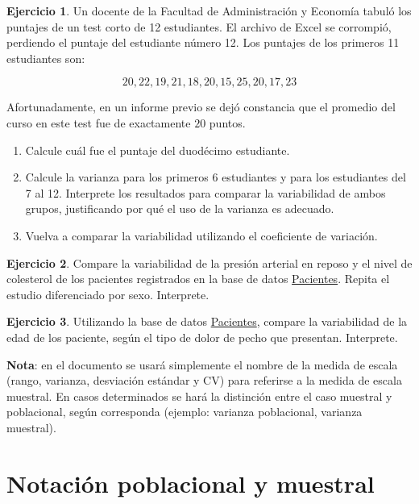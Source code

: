 \documentclass[
  11pt,
]{book}
\providecommand{\tightlist}{%
  \setlength{\itemsep}{0pt}\setlength{\parskip}{0pt}}
\theoremstyle{definition}
\theoremstyle{definition}
\theoremstyle{definition}
\newtheorem{exercise}{Ejercicio}[chapter]
\theoremstyle{definition}
\theoremstyle{remark}
\begin{document}
\begin{exercise}

Un docente de la Facultad de Administración y Economía tabuló los puntajes de un test corto de 12 estudiantes. El archivo de Excel se corrompió, perdiendo el puntaje del estudiante número 12. Los puntajes de los primeros 11 estudiantes son:

\[20, 22, 19, 21, 18, 20, 15, 25, 20, 17, 23\]

Afortunadamente, en un informe previo se dejó constancia que el promedio del curso en este test fue de exactamente \(20\) puntos.

\begin{enumerate}
\def\labelenumi{\arabic{enumi}.}
\tightlist
\item
  Calcule cuál fue el puntaje del duodécimo estudiante.
\item
  Calcule la varianza para los primeros 6 estudiantes y para los estudiantes del 7 al 12. Interprete los resultados para comparar la variabilidad de ambos grupos, justificando por qué el uso de la varianza es adecuado.
\item
  Vuelva a comparar la variabilidad utilizando el coeficiente de variación.
\end{enumerate}

\end{exercise}

\begin{exercise}
Compare la variabilidad de la presión arterial en reposo y el nivel de colesterol de los pacientes registrados en la base de datos \hyperref[Pacientes]{Pacientes}. Repita el estudio diferenciado por sexo. Interprete.
\end{exercise}

\begin{exercise}
Utilizando la base de datos \hyperref[Pacientes]{Pacientes}, compare la variabilidad de la edad de los paciente, según el tipo de dolor de pecho que presentan. Interprete.
\end{exercise}

\textbf{Nota}: en el documento se usará simplemente el nombre de la medida de escala (rango, varianza, desviación estándar y CV) para referirse a la medida de escala muestral. En casos determinados se hará la distinción entre el caso muestral y poblacional, según corresponda (ejemplo: varianza poblacional, varianza muestral).

\section{Notación poblacional y muestral}\label{topicos-notacion}
\end{document}
